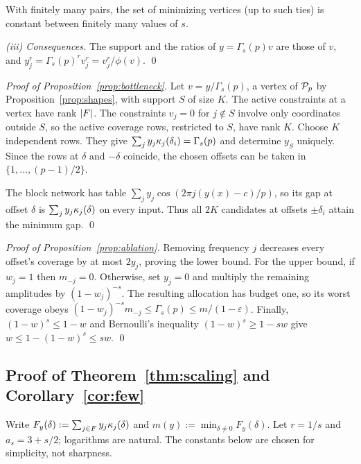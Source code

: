 With finitely many pairs, the set of minimizing vertices (up to such ties) is constant between finitely many values of $s$.

\emph{(iii) Consequences.} The support and the ratios of $y=\Gamma_s(p)v$ are those of $v$, and $y_j^r=\Gamma_s(p)^rv_j^r=v_j^r/\phi(v)$.
\qed

\emph{Proof of Proposition~\ref{prop:bottleneck}.} Let $v=y/\Gamma_s(p)$, a vertex of $\mathcal{P}_p$ by Proposition~\ref{prop:shapes}, with support $S$ of size $K$. The active constraints at a vertex have rank $|F|$. The constraints $v_j=0$ for $j\notin S$ involve only coordinates outside $S$, so the active coverage rows, restricted to $S$, have rank $K$. Choose $K$ independent rows. They give $\sum_jy_j\kappa_{j}(\delta_i)=\Gamma_s(p)$ and determine $y_S$ uniquely. Since the rows at $\delta$ and $-\delta$ coincide, the chosen offsets can be taken in $\{1,\dots,(p-1)/2\}$.

The block network has table $\sum_jy_j\cos(2\pi j(y(x)-c)/p)$, so its gap at offset $\delta$ is $\sum_jy_j\kappa_{j}(\delta)$ on every input. Thus all $2K$ candidates at offsets $\pm\delta_i$ attain the minimum gap. \qed

\emph{Proof of Proposition~\ref{prop:ablation}.} Removing frequency $j$ decreases every offset's coverage by at most $2y_j$, proving the lower bound. For the upper bound, if $w_j=1$ then $m_{-j}=0$. Otherwise, set $y_j=0$ and multiply the remaining amplitudes by $(1-w_j)^{-s}$. The resulting allocation has budget one, so its worst coverage obeys $(1-w_j)^{-s}m_{-j}\le\Gamma_s(p)\le m/(1-\varepsilon)$. Finally, $(1-w)^s\le1-w$ and Bernoulli's inequality $(1-w)^s\ge1-sw$ give $w\le1-(1-w)^s\le sw$. \qed

\subsection{Proof of Theorem~\ref{thm:scaling} and Corollary~\ref{cor:few}}\label{app:scaling}

Write $F_y(\delta):=\sum_{j\in F}y_j\kappa_{j}(\delta)$ and $m(y):=\min_{\delta\neq0}F_y(\delta)$. Let $r=1/s$ and $a_s=3+s/2$; logarithms are natural. The constants below are chosen for simplicity, not sharpness.

